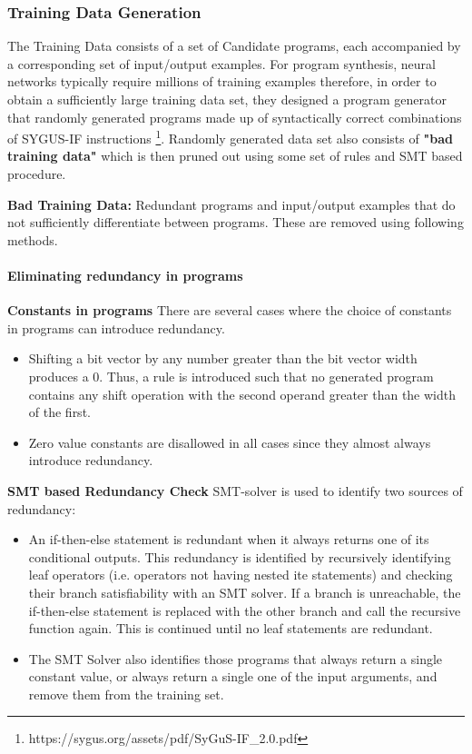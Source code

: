 \subsubsection{Training Data Generation}
The Training Data consists of a set of Candidate programs, each accompanied by a corresponding set of input/output examples. For program synthesis, neural networks typically require millions of training examples therefore, in order to obtain a sufficiently large training data set, they designed a program generator that randomly generated programs made up of syntactically correct combinations of SYGUS-IF instructions \footnote{https://sygus.org/assets/pdf/SyGuS-IF\_2.0.pdf}. Randomly generated data set also consists of \textbf{"bad training data"} which is then pruned out using some set of rules and SMT based procedure.

\noindent\textbf{Bad Training Data:} Redundant programs and input/output examples that do not sufficiently
differentiate between programs. These are removed using following methods.

\paragraph{Eliminating redundancy in programs}
\noindent\textbf{Constants in programs} There are several cases where the choice of constants in programs can introduce redundancy. 
\begin{itemize}
    \item Shifting a bit vector by any number greater than the bit vector width produces a 0. Thus, a rule is introduced such that no generated program contains any shift operation with the second operand greater than the width of the first.
    \item Zero value constants are disallowed in all cases since they almost always introduce redundancy.
\end{itemize}

\noindent\textbf{SMT based Redundancy Check} SMT-solver is used to identify two sources of redundancy:
\begin{itemize}
    \item An if-then-else statement is redundant when it always returns one of its conditional outputs. This redundancy is identified by recursively identifying leaf operators (i.e. operators not having nested ite statements) and checking their branch satisfiability with an SMT solver. If a branch is unreachable, the if-then-else statement is replaced with the other branch and call the recursive function again. This is continued until no leaf statements are redundant.
    \item The SMT Solver also identifies  those programs that always return a single constant value, or always return a single one of the input arguments, and remove them from the training set.
\end{itemize}

